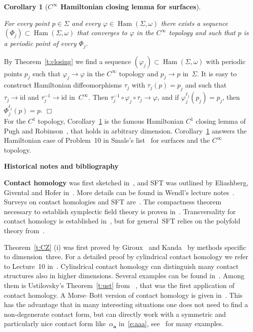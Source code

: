 \documentclass[12pt,twoside]{amsart}
\theoremstyle{plain}
\newtheorem{corollary}[theorem]{Corollary}
\numberwithin{figure}{section}
\numberwithin{equation}{section}
\newcommand{\proofend}{\hspace*{\fill} $\Box$\\}
\def\s{\smallskip}
\def\m{\medskip}
\def\Ham{\operatorname{Ham}}
\def\aa{\boldsymbol{a}}
\def\ga{\alpha}
\def\gf{\varphi}
\def\go{\omega}
\def\ni{\noindent}
\def\m{\medskip}
\def\id{\mbox{id}}
\def\proof{\noindent {\it Proof. \;}}
\begin{document}
\begin{corollary} 
[\bf $C^\infty$ Hamiltonian closing lemma for surfaces]
\label{cor:closing}

For every point $p \in \Sigma$ and every $\gf \in \Ham (\Sigma,\go)$ there exists a sequence $(\Phi_j) \subset \Ham (\Sigma,\go)$
that converges to $\gf$ in the $C^\infty$ topology and such that $p$ is a periodic point of every $\Phi_j$.
\end{corollary}

\proof
By Theorem~\ref{t:closing} we find a sequence $(\gf_j) \subset \Ham (\Sigma,\go)$ with periodic points $p_j$
such that $\gf_j \to \gf$ in the $C^\infty$ topology and $p_j \to p$ in~$\Sigma$. 
It is easy to construct Hamiltonian diffeomorphisms $\tau_j$ with $\tau_j(p) =p_j$ and such that
$\tau_j \to \id$ and $\tau_j^{-1} \to \id$ in~$C^\infty$.
Then $\tau_j^{-1} \circ \gf_j \circ \tau_j \to \gf$,
and if $\gf_j^{\ell_j}(p_j) = p_j$, then $\Phi_j^{\ell_j}(p) =p$.
\proofend

For the $C^1$ topology, Corollary~\ref{cor:closing} is the famous Hamiltonian $C^1$ closing lemma of Pugh and Robinson~\cite{PuRo83}, 
that holds in arbitrary dimension.
Corollary~\ref{cor:closing} answers the Hamiltonian case of Problem~10 in Smale's list~\cite{Sma98} 
for surfaces and the $C^\infty$ topology.


\m \ni
{\bf Historical notes and bibliography}

\s \ni
{\bf Contact homology} was first sketched in~\cite{El98},
and SFT was outlined by Eliashberg, Givental and Hofer in~\cite{ElGiHo00}.
More details can be found in Wendl's lecture notes~\cite{We16}.
Surveys on contact homologies and SFT are~\cite{bo09, el07}.
%
The compactness theorem necessary to establish symplectic field theory is proven in~\cite{boelhowyze03}.
Transversality for contact homology is established in~\cite{Par15},
but for general~SFT relies on the polyfold theory from~\cite{Ho04, HWZ17}.


Theorem~\ref{t:CZ} (i) was first proved by Giroux~\cite{gir94} and Kanda~\cite{kan97}
by methods specific to dimension~three.
For a detailed proof by cylindrical contact homology we refer to Lecture~10 in~\cite{We16}.
Cylindrical contact homology can distinguish many contact structures also in higher dimensions.
Several examples can be found in~\cite{bou02}.
Among them is Ustilovsky's Theorem~\ref{t:ust} from ~\cite{ust99},
that was the first application of contact homology.
%
A Morse--Bott version of contact homology is given in~\cite{bou02}.
This has the advantage that in many interesting situations one does not need to find a non-degenerate contact form,
but can directly work with a symmetric and particularly nice contact form like~$\ga_{\aa}$ in~\eqref{e:aaa},
see~\cite{bou02, vko08} for many examples.
\end{document}
